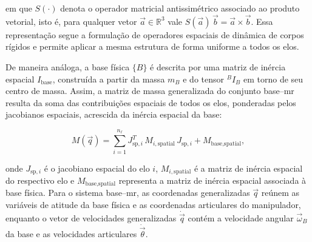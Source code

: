 em que $S(\cdot)$ denota o operador matricial antissimétrico associado ao produto vetorial, isto é, para qualquer vetor $\vec a\in\mathbb{R}^3$ vale $S(\vec a)\,\vec b = \vec a \times \vec b$.
Essa representação segue a formulação de operadores espaciais de dinâmica de corpos rígidos e permite aplicar a mesma estrutura de forma uniforme a todos os elos.

De maneira análoga, a base física $\{B\}$ é descrita por uma matriz de inércia espacial $I_{\text{base}}$, construída a partir da massa $m_B$ e do tensor ${}^{B}\!I_B$ em torno de seu centro de massa.
Assim, a matriz de massa generalizada do conjunto base--\gls{mr} resulta da soma das contribuições espaciais de todos os elos, ponderadas pelos jacobianos espaciais, acrescida da inércia espacial da base:

\begin{equation}
M(\vec q) =
\sum_{i=1}^{n_\ell}
J_{\text{sp},i}^{T}\, M_{i,\text{spatial}}\, J_{\text{sp},i}
+ M_{\text{base},\text{spatial}},
\label{eq:M_total_formula}
\end{equation}

onde $J_{\text{sp},i}$ é o jacobiano espacial do elo $i$, $M_{i,\text{spatial}}$ é a matriz de inércia espacial do respectivo elo e $M_{\text{base},\text{spatial}}$ representa a matriz de inércia espacial associada à base física.
Para o sistema base--\gls{mr}, as coordenadas generalizadas $\vec q$ reúnem as variáveis de atitude da base física e as coordenadas articulares do manipulador, enquanto o vetor de velocidades generalizadas $\dot{\vec q}$ contém a velocidade angular $\vec{\omega}_B$ da base e as velocidades articulares $\dot{\vec \theta}$.

